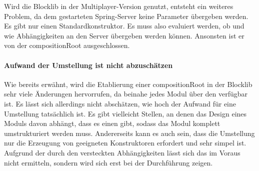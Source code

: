Wird die Blocklib in der Multiplayer-Version genutzt, entsteht ein weiteres Problem, da dem gestarteten Spring-Server keine Parameter übergeben werden. Es gibt nur einen Standardkonstruktor. Es muss also evaluiert werden, ob und wie Abhängigkeiten an den Server übergeben werden können. Ansonsten ist er von der \gls{compositionRoot} ausgeschlossen.

\paragraph{Aufwand der Umstellung ist nicht abzuschätzen}
Wie bereits erwähnt, wird die Etablierung einer \gls{compositionRoot} in der Blocklib sehr viele Änderungen hervorrufen, da beinahe jedes Modul über den  verfügbar ist. Es lässt sich allerdings nicht abschätzen, wie hoch der Aufwand für eine Umstellung tatsächlich ist. Es gibt vielleicht Stellen, an denen das Design eines Moduls davon abhängt, dass es einen  gibt, sodass das Modul komplett umstrukturiert werden muss. Andererseits kann es auch sein, dass die Umstellung nur die Erzeugung von geeigneten Konstruktoren erfordert und sehr simpel ist. Aufgrund der durch den  versteckten Abhängigkeiten lässt sich das im Voraus nicht ermitteln, sondern wird sich erst bei der Durchführung zeigen.
